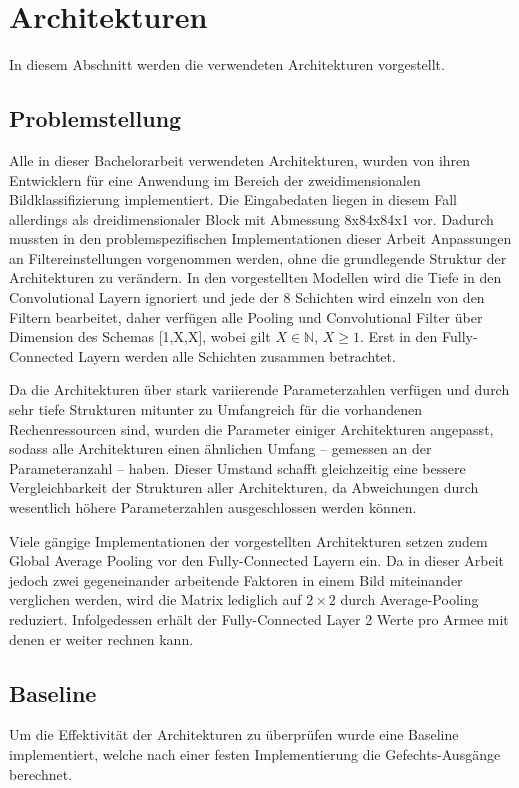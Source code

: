 \section{Architekturen}
\label{Archs}

In diesem Abschnitt werden die verwendeten Architekturen vorgestellt.

\subsection{Problemstellung}
Alle in dieser Bachelorarbeit verwendeten Architekturen, wurden von ihren Entwicklern für eine Anwendung im Bereich der zweidimensionalen Bildklassifizierung implementiert. Die Eingabedaten liegen in diesem Fall allerdings als dreidimensionaler Block mit Abmessung 8x84x84x1 vor. Dadurch mussten in den problemspezifischen Implementationen dieser Arbeit Anpassungen an Filtereinstellungen vorgenommen werden, ohne die grundlegende Struktur der Architekturen zu verändern. In den vorgestellten Modellen wird die Tiefe in den Convolutional Layern ignoriert und jede der 8 Schichten wird einzeln von den Filtern bearbeitet, daher verfügen alle Pooling und Convolutional Filter über Dimension des Schemas [1,X,X], wobei gilt $X \in \mathbb{N}$, $X \geq 1$. Erst in den Fully-Connected Layern werden alle Schichten zusammen betrachtet. 

Da die Architekturen über stark variierende Parameterzahlen verfügen und durch sehr tiefe Strukturen mitunter zu Umfangreich für die vorhandenen Rechenressourcen sind, wurden die Parameter einiger Architekturen angepasst, sodass alle Architekturen einen ähnlichen Umfang -- gemessen an der Parameteranzahl -- haben. Dieser Umstand schafft gleichzeitig eine bessere Vergleichbarkeit der Strukturen aller Architekturen, da Abweichungen durch wesentlich höhere Parameterzahlen ausgeschlossen werden können. 

Viele gängige Implementationen der vorgestellten Architekturen setzen zudem Global Average Pooling vor den Fully-Connected Layern ein. Da in dieser Arbeit jedoch zwei gegeneinander arbeitende Faktoren in einem Bild miteinander verglichen werden, wird die Matrix lediglich auf $2 \times 2$ durch Average-Pooling reduziert. Infolgedessen erhält der Fully-Connected Layer 2 Werte pro Armee mit denen er weiter rechnen kann. 
 
\subsection{Baseline}
Um die Effektivität der Architekturen zu überprüfen wurde eine Baseline implementiert, welche nach einer festen Implementierung die Gefechts-Ausgänge berechnet. 


